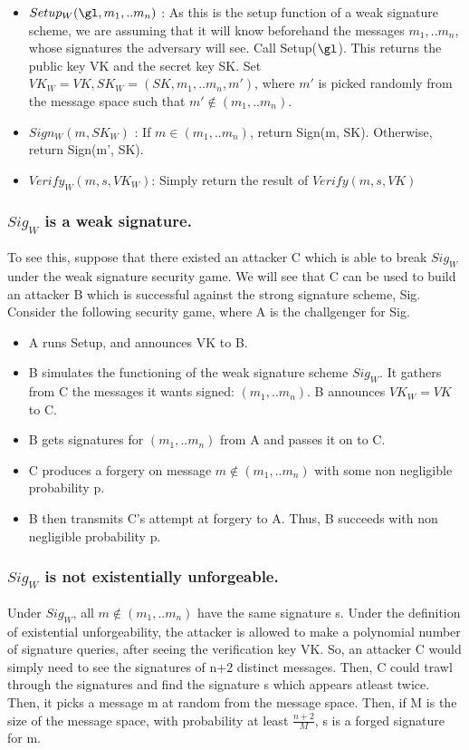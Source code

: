\documentclass[10pt]{article}
\begin{document}
\begin{itemize}
 \item $Setup_W(\gl, m_{1}, .. m_{n})$ :
 \subitem As this is the setup function of a weak signature scheme, we are assuming that it will know beforehand the messages $m_{1}, .. m_{n}$, whose signatures the adversary will see.
 \subitem Call Setup($\gl$). This returns the public key VK and the secret key SK. Set $VK_{W} = VK, SK_W = (SK, m_{1}, .. m_{n}, m')$, where $m'$ is picked randomly from the message space such that $m' \notin (m_{1}, .. m_{n})$.

\item $Sign_{W}(m, SK_W)$ : 
 \subitem If $m \in (m_{1}, .. m_{n})$, return Sign(m, SK). Otherwise, return Sign(m', SK).
\item $Verify_{W}(m, s, VK_W)$:
 \subitem Simply return the result of $Verify(m, s, VK)$
\end{itemize}

\subsubsection*{$Sig_W$ is a weak signature.}
To see this, suppose that there existed an attacker C which is able to break $Sig_W$ under the weak signature security game. We will see that C can be used to build an attacker B which is successful against the strong signature scheme, Sig. Consider the following security game, where A is the challgenger for Sig.

\begin{itemize}
 \item A runs Setup, and announces VK to B.
 \item B simulates the functioning of the weak signature scheme $Sig_W$.
 \subitem It gathers from C the messages it wants signed: $(m_{1}, .. m_{n})$.
 \subitem B announces $VK_{W} = VK$ to C.
 \item B gets signatures for $(m_{1}, .. m_{n})$ from A and passes it on to C.
 \item C produces a forgery on message $m \notin (m_{1}, .. m_{n})$ with some non negligible probability p.
 \item B then transmits C's attempt at forgery to A. Thus, B succeeds with non negligible probability p.
\end{itemize}

\subsubsection*{$Sig_W$ is not existentially unforgeable.}
Under $Sig_W$, all $m \notin (m_{1}, .. m_{n})$ have the same signature s. Under the definition of existential unforgeability, the attacker is allowed to make a polynomial number of signature queries, after seeing the verification key VK. So, an attacker C would simply need to see the signatures of n+2 distinct messages. Then, C could trawl through the signatures and find the signature s which appears atleast twice. Then, it picks a message m at random from the message space. Then, if M is the size of the message space, with probability at least $\frac{n+2}{M}$, s is a forged signature for m.
\end{document}
